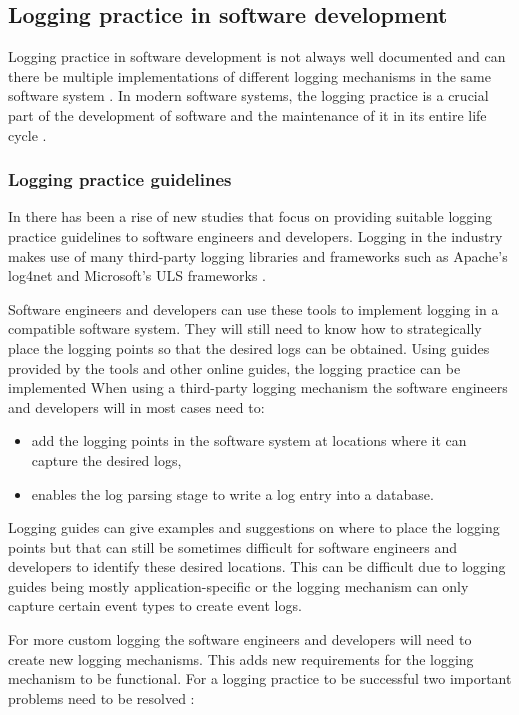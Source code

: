 \clearpage

\subsection{Logging practice in software development}
Logging practice in software development is not always well documented and can there be multiple implementations of different logging mechanisms in the same software system \cite{Pecchia2015, Kitchenham2007}. In modern software systems, the logging practice is a crucial part of the development of software and the maintenance of it in its entire life cycle \cite{Rong2018}.

\subsubsection{Logging practice guidelines}
In  there has been a rise of new studies that focus on providing suitable logging practice guidelines to software engineers and developers. Logging in the industry makes use of many third-party logging libraries and frameworks such as Apache's log4net and Microsoft's ULS frameworks \cite{Zhu2015, Rong2018}.\par Software engineers and developers can use these tools to implement logging in a compatible software system. They will still need to know how to strategically place the logging points so that the desired logs can be obtained. Using guides provided by the tools and other online guides, the logging practice can be implemented When using a third-party logging mechanism the software engineers and developers will in most cases need to:

\begin{itemize}
	\item add the logging points in the software system at locations where it can capture the desired logs,
	\item enables the log parsing stage to write a log entry into a database.
\end{itemize}

Logging guides can give examples and suggestions on where to place the logging points but that can still be sometimes difficult for software engineers and developers to identify these desired locations. This can be difficult due to logging guides being mostly application-specific or the logging mechanism can only capture certain event types to create event logs. \par For more custom logging the software engineers and developers will need to create new logging mechanisms. This adds new requirements for the logging mechanism to be functional. For a logging practice to be successful two important problems need to be resolved \cite{Zhu2015, Zhu2019, Rong2018}:


